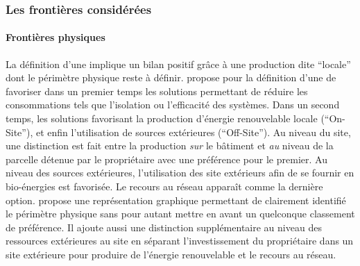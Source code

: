 \subsubsection{Les frontières considérées} %
\label{ssub:les_frontieres_considerees}
\paragraph{Frontières physiques} %
\label{par:frontières_physiques}
La définition d’une  implique un bilan positif grâce à une production dite
\enquote{locale} dont le périmètre physique reste à définir.
\textcite{Torcellini2006} propose pour la définition d’une 
de favoriser dans un premier temps les solutions permettant de réduire les consommations
tels que l’isolation ou l’efficacité des systèmes. Dans un second temps, les solutions favorisant
la production d’énergie renouvelable locale (\enquote{On-Site}), et enfin
l’utilisation de sources extérieures (\enquote{Off-Site}). Au niveau du site, une
distinction est fait entre la production \emph{sur} le bâtiment et \emph{au} niveau de la
parcelle détenue par le propriétaire avec une préférence pour le premier.
Au niveau des sources extérieures, l’utilisation des site extérieurs afin de se
fournir en bio-énergies est favorisée. Le recours au réseau apparaît comme la dernière option.
\textcite{Marszal2010} propose une représentation graphique permettant de clairement
identifié le périmètre physique sans pour autant mettre en avant un quelconque
classement de préférence. Il ajoute aussi une distinction supplémentaire au niveau
des ressources extérieures au site en séparant l’investissement du propriétaire dans
un site extérieure pour produire de l’énergie renouvelable et le recours au réseau.

